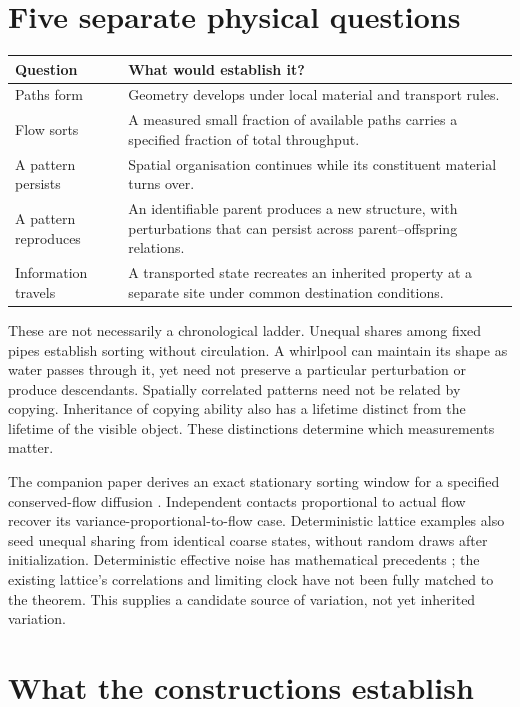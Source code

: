 \documentclass[11pt,a4paper]{article}
\begin{document}
\section{Five separate physical questions}

\begin{center}
\begin{tabular}{@{}p{.24\linewidth}p{.71\linewidth}@{}}
\toprule
Question & What would establish it?\\
\midrule
Paths form & Geometry develops under local material and transport rules.\\[3pt]
Flow sorts & A measured small fraction of available paths carries a specified
fraction of total throughput.\\[3pt]
A pattern persists & Spatial organisation continues while its constituent
material turns over.\\[3pt]
A pattern reproduces & An identifiable parent produces a new structure, with
perturbations that can persist across parent--offspring relations.\\[3pt]
Information travels & A transported state recreates an inherited property
at a separate site under common destination conditions.\\
\bottomrule
\end{tabular}
\end{center}

These are not necessarily a chronological ladder. Unequal shares among fixed
pipes establish sorting without circulation. A whirlpool can maintain its shape
as water passes through it, yet need not preserve a particular perturbation or
produce descendants. Spatially correlated patterns need not be related by copying.
Inheritance of copying ability also has a lifetime distinct from the lifetime
of the visible object. These distinctions determine which measurements matter.

The companion paper derives an exact stationary sorting window for a specified
conserved-flow diffusion \cite{sorting}. Independent contacts proportional to
actual flow recover its variance-proportional-to-flow case. Deterministic lattice
examples also seed unequal sharing from identical coarse states, without random
draws after initialization. Deterministic effective noise has mathematical
precedents \cite{melbourne}; the existing lattice's correlations and limiting
clock have not been fully matched to the theorem. This supplies a candidate
source of variation, not yet inherited variation.

\section{What the constructions establish}
\end{document}

